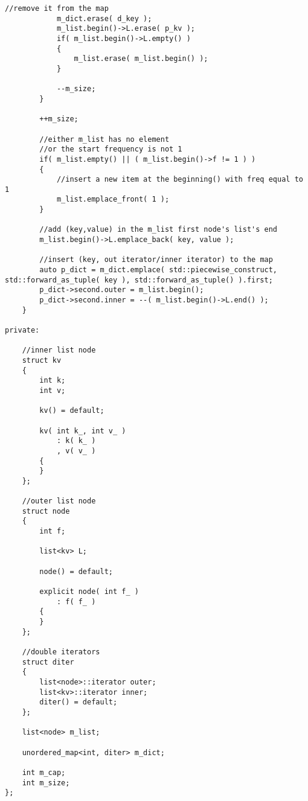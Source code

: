 \begin{lstlisting}[style=customc, caption={List And Hash Map}]
            //remove it from the map
            m_dict.erase( d_key );
            m_list.begin()->L.erase( p_kv );
            if( m_list.begin()->L.empty() )
            {
                m_list.erase( m_list.begin() );
            }

            --m_size;
        }

        ++m_size;

        //either m_list has no element
        //or the start frequency is not 1
        if( m_list.empty() || ( m_list.begin()->f != 1 ) )
        {
            //insert a new item at the beginning() with freq equal to 1
            m_list.emplace_front( 1 );
        }

        //add (key,value) in the m_list first node's list's end
        m_list.begin()->L.emplace_back( key, value );

        //insert (key, out iterator/inner iterator) to the map
        auto p_dict = m_dict.emplace( std::piecewise_construct, std::forward_as_tuple( key ), std::forward_as_tuple() ).first;
        p_dict->second.outer = m_list.begin();
        p_dict->second.inner = --( m_list.begin()->L.end() );
    }

private:

    //inner list node
    struct kv
    {
        int k;
        int v;

        kv() = default;

        kv( int k_, int v_ )
            : k( k_ )
            , v( v_ )
        {
        }
    };

    //outer list node
    struct node
    {
        int f;

        list<kv> L;

        node() = default;

        explicit node( int f_ )
            : f( f_ )
        {
        }
    };

    //double iterators
    struct diter
    {
        list<node>::iterator outer;
        list<kv>::iterator inner;
        diter() = default;
    };

    list<node> m_list;

    unordered_map<int, diter> m_dict;

    int m_cap;
    int m_size;
};
\end{lstlisting}